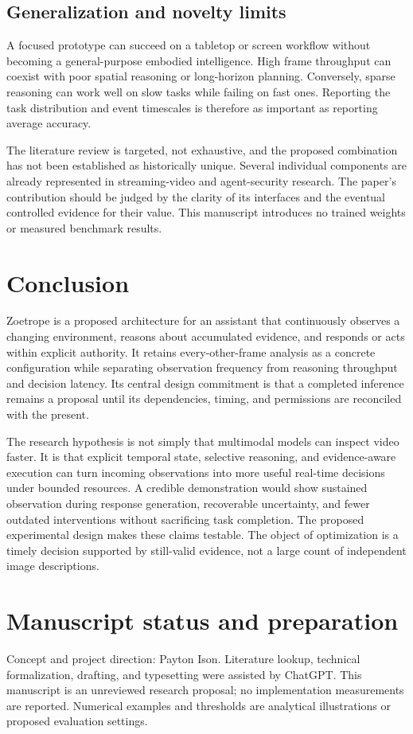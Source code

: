 \documentclass[11pt,letterpaper]{article}
\begin{document}
\subsection{Generalization and novelty limits}
A focused prototype can succeed on a tabletop or screen workflow without becoming a general-purpose embodied intelligence. High frame throughput can coexist with poor spatial reasoning or long-horizon planning. Conversely, sparse reasoning can work well on slow tasks while failing on fast ones. Reporting the task distribution and event timescales is therefore as important as reporting average accuracy.

The literature review is targeted, not exhaustive, and the proposed combination has not been established as historically unique. Several individual components are already represented in streaming-video and agent-security research. The paper's contribution should be judged by the clarity of its interfaces and the eventual controlled evidence for their value. This manuscript introduces no trained weights or measured benchmark results.

\section{Conclusion}
Zoetrope is a proposed architecture for an assistant that continuously observes a changing environment, reasons about accumulated evidence, and responds or acts within explicit authority. It retains every-other-frame analysis as a concrete configuration while separating observation frequency from reasoning throughput and decision latency. Its central design commitment is that a completed inference remains a proposal until its dependencies, timing, and permissions are reconciled with the present.

The research hypothesis is not simply that multimodal models can inspect video faster. It is that explicit temporal state, selective reasoning, and evidence-aware execution can turn incoming observations into more useful real-time decisions under bounded resources. A credible demonstration would show sustained observation during response generation, recoverable uncertainty, and fewer outdated interventions without sacrificing task completion. The proposed experimental design makes these claims testable. The object of optimization is a timely decision supported by still-valid evidence, not a large count of independent image descriptions.

\section*{Manuscript status and preparation}
Concept and project direction: Payton Ison. Literature lookup, technical formalization, drafting, and typesetting were assisted by ChatGPT. This manuscript is an unreviewed research proposal; no implementation measurements are reported. Numerical examples and thresholds are analytical illustrations or proposed evaluation settings.
\end{document}
